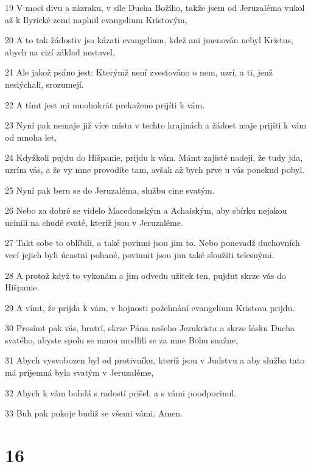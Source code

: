 \par 19 V moci divu a zázraku, v síle Ducha Božího, takže jsem od Jeruzaléma vukol až k Ilyrické zemi naplnil evangelium Kristovým,
\par 20 A to tak žádostiv jsa kázati evangelium, kdež ani jmenován nebyl Kristus, abych na cizí základ nestavel,
\par 21 Ale jakož psáno jest: Kterýmž není zvestováno o nem, uzrí, a ti, jenž neslýchali, srozumejí.
\par 22 A tímt jest mi mnohokrát prekaženo prijíti k vám.
\par 23 Nyní pak nemaje již více místa v techto krajinách a žádost maje prijíti k vám od mnoha let,
\par 24 Kdyžkoli pujdu do Hišpanie, prijdu k vám. Mámt zajisté nadeji, že tudy jda, uzrím vás, a že vy mne provodíte tam, avšak až bych prve u vás ponekud pobyl.
\par 25 Nyní pak beru se do Jeruzaléma, službu cine svatým.
\par 26 Nebo za dobré se videlo Macedonským a Achaiským, aby sbírku nejakou ucinili na chudé svaté, kteríž jsou v Jeruzaléme.
\par 27 Takt sobe to oblíbili, a také povinni jsou jim to. Nebo ponevadž duchovních vecí jejich byli úcastni pohané, povinnit jsou jim také sloužiti telesnými.
\par 28 A protož když to vykonám a jim odvedu užitek ten, pujdut skrze vás do Hišpanie.
\par 29 A vímt, že prijda k vám, v hojnosti požehnání evangelium Kristova prijdu.
\par 30 Prosímt pak vás, bratrí, skrze Pána našeho Jezukrista a skrze lásku Ducha svatého, abyste spolu se mnou modlili se za mne Bohu snažne,
\par 31 Abych vysvobozen byl od protivníku, kteríž jsou v Judstvu a aby služba tato má príjemná byla svatým v Jeruzaléme,
\par 32 Abych k vám bohdá s radostí prišel, a s vámi poodpocinul.
\par 33 Buh pak pokoje budiž se všemi vámi. Amen.

\chapter{16}

